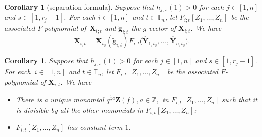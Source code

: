 \documentclass[10pt,a4paper]{amsart}
\numberwithin{equation}{section}
\newtheorem{Corollary}[Theorem]{Corollary}
\begin{document}
\begin{Corollary}[separation formula]\label{c:separation-formula}
Suppose that $h_{j,s}(1)>0$ for each $j\in [1,n]$ and $s\in [1,r_j-1]$. For each $i\in [1,n]$ and $t\in \mathbb{T}_n$, let $F_{i;t}[Z_1,\dots, Z_n]$ be the associated $F$-polynomial of~$\mathbf{X}_{i;t}$ and $\tilde{\mathbf{g}}_{i;t}$ the $g$-vector of $\mathbf{X}_{i;t}$. We have
\[\mathbf{X}_{i;t}=\mathbf{X}_{t_0}(\mathbf{\tilde{g}}_{i;t})F_{i;t}\bigl(\mathbf{\hat{Y}}_{1;t_{0}},\dots,\mathbf{\hat{Y}}_{n;t_{0}}\bigr).\]
\end{Corollary}
\begin{Corollary}\label{c:constant-term-1}
 Suppose that $h_{j,s}(1)>0$ for each $j\in [1,n]$ and $s\in [1,r_j-1]$. For each~${i\in [1,n]}$ and $t\in \mathbb{T}_n$, let $F_{i;t}[Z_1,\dots, Z_n]$ be the associated $F$-polynomial of $\mathbf{X}_{i;t}$. We have
\begin{itemize}\itemsep=0pt
 \item[$(1)$] There is a unique monomial $q^{\frac{1}{2}a}\mathbf{Z}(f),a\in\mathbb{Z},$ in $F_{i;t}[Z_1,\dots, Z_n]$ such that it is divisible by all the other monomials in $F_{i;t}[Z_1,\dots, Z_n]$;
 \item[$(2)$] $F_{i;t}[Z_1,\dots, Z_n]$ has constant term $1$.
\end{itemize}
\end{Corollary}
\end{document}
